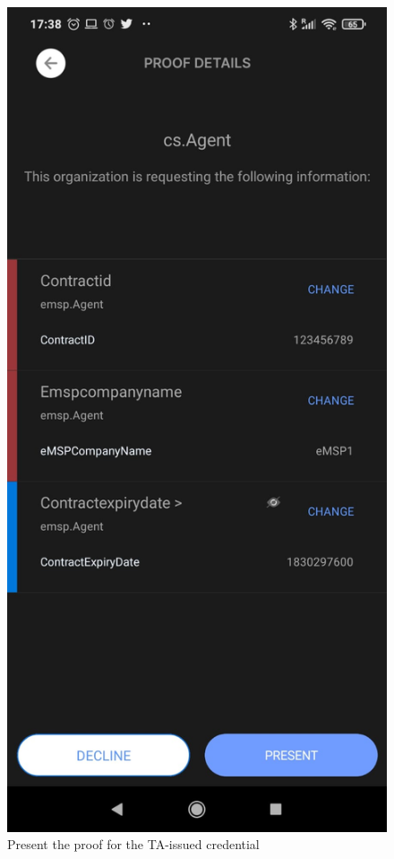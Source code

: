 \begin{figure}[H]
\begin{minipage}{.33\textwidth}
  \includegraphics[width=.8\linewidth]{images/Frontend/Charging/3.1.jpeg}
  \caption[]{Present the proof for the TA-issued credential}
  \label{fig:charging_screenshot_3.1}
\end{minipage}
\begin{minipage}{.33\textwidth}
  \centering

\end{minipage}
\end{figure}

